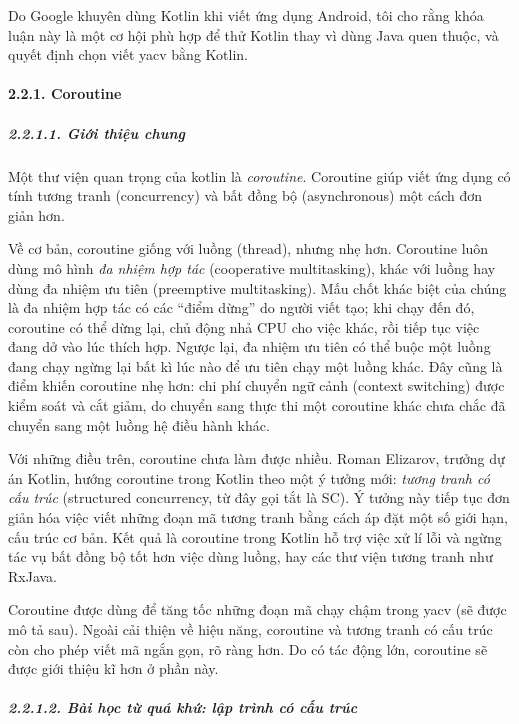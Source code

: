 Do Google khuyên dùng Kotlin khi viết ứng dụng Android, tôi cho rằng
khóa luận này là một cơ hội phù hợp để thử Kotlin thay vì dùng Java quen
thuộc, và quyết định chọn viết yacv bằng Kotlin.

\hypertarget{coroutine}{%
  \paragraph{\texorpdfstring{2.2.1. Coroutine
    }{2.2.1. Coroutine }}\label{coroutine}}

\hypertarget{giux1edbi-thiux1ec7u-chung}{%
  \subparagraph{2.2.1.1. Giới thiệu
    chung}\label{giux1edbi-thiux1ec7u-chung}}

Một thư viện quan trọng của kotlin là \emph{coroutine}. Coroutine giúp
viết ứng dụng có tính tương tranh (concurrency) và bất đồng bộ
(asynchronous) một cách đơn giản hơn.

Về cơ bản, coroutine giống với luồng (thread), nhưng nhẹ hơn. Coroutine
luôn dùng mô hình \emph{đa nhiệm hợp tác} (cooperative multitasking),
khác với luồng hay dùng đa nhiệm ưu tiên (preemptive multitasking). Mấu
chốt khác biệt của chúng là đa nhiệm hợp tác có các ``điểm dừng'' do
người viết tạo; khi chạy đến đó, coroutine có thể dừng lại, chủ động nhả
CPU cho việc khác, rồi tiếp tục việc đang dở vào lúc thích hợp. Ngược
lại, đa nhiệm ưu tiên có thể buộc một luồng đang chạy ngừng lại bất kì
lúc nào để ưu tiên chạy một luồng khác. Đây cũng là điểm khiến coroutine
nhẹ hơn: chi phí chuyển ngữ cảnh (context switching) được kiểm soát và
cắt giảm, do chuyển sang thực thi một coroutine khác chưa chắc đã chuyển
sang một luồng hệ điều hành khác.

Với những điều trên, coroutine chưa làm được nhiều. Roman Elizarov,
trưởng dự án Kotlin, hướng coroutine trong Kotlin theo một ý tưởng mới:
\emph{tương tranh có cấu trúc} (structured concurrency, từ đây gọi tắt
là SC). Ý tưởng này tiếp tục đơn giản hóa việc viết những đoạn mã tương
tranh bằng cách áp đặt một số giới hạn, cấu trúc cơ bản. Kết quả là
coroutine trong Kotlin hỗ trợ việc xử lí lỗi và ngừng tác vụ bất đồng bộ
tốt hơn việc dùng luồng, hay các thư viện tương tranh như RxJava.

Coroutine được dùng để tăng tốc những đoạn mã chạy chậm trong yacv (sẽ
được mô tả sau). Ngoài cải thiện về hiệu năng, coroutine và tương tranh
có cấu trúc còn cho phép viết mã ngắn gọn, rõ ràng hơn. Do có tác động
lớn, coroutine sẽ được giới thiệu kĩ hơn ở phần này.

\hypertarget{buxe0i-hux1ecdc-tux1eeb-quuxe1-khux1ee9-lux1eadp-truxecnh-cuxf3-cux1ea5u-truxfac}{%
  \subparagraph{2.2.1.2. Bài học từ quá khứ: lập trình có cấu
    trúc}\label{buxe0i-hux1ecdc-tux1eeb-quuxe1-khux1ee9-lux1eadp-truxecnh-cuxf3-cux1ea5u-truxfac}}

